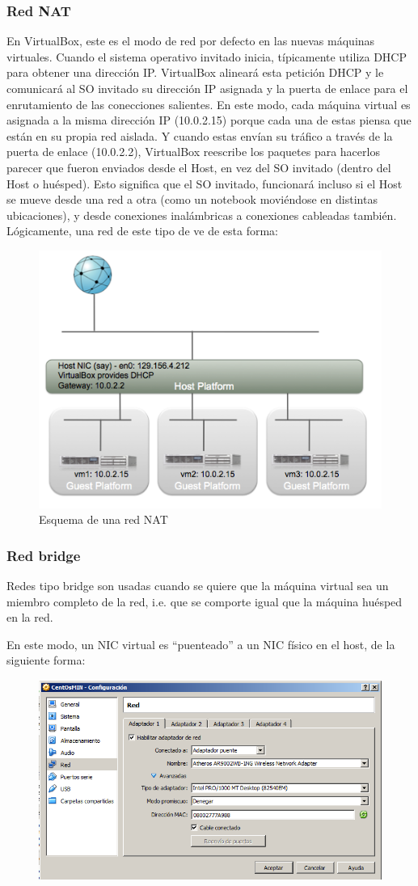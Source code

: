 \documentclass[11pt]{article}
\begin{document}
\subsubsection{Red NAT}
	En VirtualBox, este es el modo de red por defecto en las nuevas máquinas virtuales. Cuando el sistema operativo invitado inicia, típicamente utiliza DHCP para obtener una dirección IP. VirtualBox alineará esta petición DHCP y le comunicará al SO invitado su dirección IP asignada y la puerta de enlace para el enrutamiento de las conecciones salientes. En este modo, cada máquina virtual es asignada a la misma dirección IP (10.0.2.15) porque cada una de estas piensa que están en su propia red aislada. Y cuando estas envían su tráfico a través de la puerta de enlace (10.0.2.2), VirtualBox reescribe los paquetes para hacerlos parecer que fueron enviados desde el Host, en vez del SO invitado (dentro del Host o huésped).
	Esto significa que el SO invitado, funcionará incluso si el Host se mueve desde una red a otra (como un notebook moviéndose en distintas ubicaciones), y desde conexiones inalámbricas a conexiones cableadas también. Lógicamente, una red de este tipo de ve de esta forma:

	\begin{figure}[ht]
	\center
	\includegraphics[width=0.5\linewidth]{ss/nat-network.png} 
	\caption{Esquema de una red NAT}
	\end{figure}


\subsubsection{Red bridge}
	Redes tipo bridge son usadas cuando se quiere que la máquina virtual sea un miembro completo de la red, i.e. que se comporte igual que la máquina huésped en la red.

	En este modo, un NIC virtual es ``puenteado'' a un NIC físico en el host, de la siguiente forma:

	\begin{figure}[ht]
	\center
	\includegraphics[width=0.5\linewidth]{ss/MIN/bridge/bridge-mv-min.png}
	\end{figure}
\end{document}
